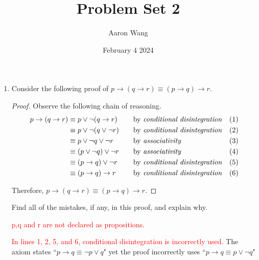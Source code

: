 \documentclass{article}
\title{Problem Set 2}
\author{Aaron Wang}
\date{February 4 2024}
\begin{document}
\maketitle
\begin {enumerate}
    \item Consider the following proof of $p \rightarrow (q \rightarrow r) \equiv (p \rightarrow q) \rightarrow r$.

      \vspace{2ex}
      \begin{proof}
        Observe the following chain of reasoning.
        \begin{align*}
          p \rightarrow (q \rightarrow r)
            &\equiv p \lor \neg(q \rightarrow r)
              &\quad
              &\text{by \emph{conditional disintegration}} 
              & (1)
              \\
            &\equiv p \lor \neg(q \lor \neg r)
              &\quad
              &\text{by \emph{conditional disintegration}} & (2)
              \\
            &\equiv p \lor \neg q \lor \neg r
              &\quad
              &\text{by \emph{associativity}} 
              & (3)
              \\
            &\equiv (p \lor \neg q) \lor \neg r
              &\quad
              &\text{by \emph{associativity}} 
              & (4)
              \\
            &\equiv (p \rightarrow q) \lor \neg r
              &\quad
              &\text{by \emph{conditional disintegration}} & (5)
              \\
            &\equiv (p \rightarrow q) \rightarrow r
              &\quad
              &\text{by \emph{conditional disintegration}}
              & (6)
        \end{align*}
        
        Therefore, $p \rightarrow (q \rightarrow r) \equiv (p \rightarrow q) \rightarrow r$.
        \end{proof}
        
        Find all of the mistakes, if any, in this proof, and explain why.

        \textcolor{red}{p,q and r are not declared as propositions.}
        
        \textcolor{red}{In lines 1, 2, 5, and 6, conditional disintegration is incorrectly used}. The axiom states ``$p\rightarrow q\equiv\neg p\lor q$" yet the proof incorrectly uses ``$p\rightarrow q\equiv p\lor\neg q$"
        

\end{enumerate}
\end{document}
